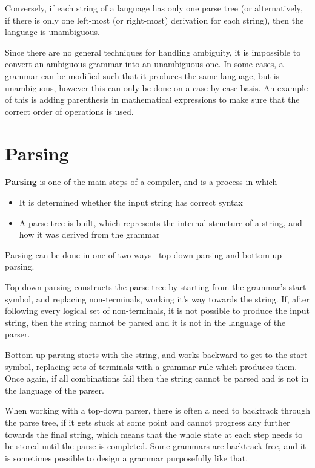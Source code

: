 Conversely, if each string of a language has only one parse tree (or alternatively, if there is only one left-most (or
 right-most) derivation for each string), then the language is unambiguous.

Since there are no general techniques for handling ambiguity, it is impossible to convert an ambiguous grammar into an
 unambiguous one. In some cases, a grammar can be modified such that it produces the same language, but is unambiguous,
 however this can only be done on a case-by-case basis. An example of this is adding parenthesis in mathematical
 expressions to make sure that the correct order of operations is used.

\section*{Parsing}

\textbf{Parsing} is one of the main steps of a compiler, and is a process in which
\begin{itemize}
  \item It is determined whether the input string has correct syntax
  \item A parse tree is built, which represents the internal structure of a string, and how it was derived from the
   grammar
\end{itemize}

Parsing can be done in one of two ways-- top-down parsing and bottom-up parsing.

Top-down parsing constructs the parse tree by starting from the grammar's start symbol, and replacing non-terminals,
 working it's way towards the string. If, after following every logical set of non-terminals, it is not possible to
 produce the input string, then the string cannot be parsed and it is not in the language of the parser.

Bottom-up parsing starts with the string, and works backward to get to the start symbol, replacing sets of terminals
 with a grammar rule which produces them. Once again, if all combinations fail then the string cannot be parsed and is
 not in the language of the parser.

When working with a top-down parser, there is often a need to backtrack through the parse tree, if it gets stuck at some
 point and cannot progress any further towards the final string, which means that the whole state at each step needs to
 be stored until the parse is completed. Some grammars are backtrack-free, and it is sometimes possible to design a
 grammar purposefully like that.

